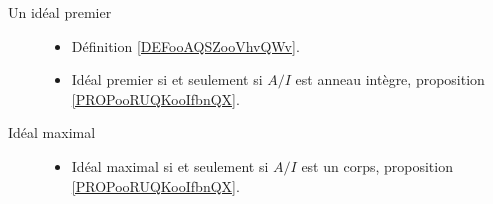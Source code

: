 \begin{description}
	\item[Un idéal premier]
		\begin{itemize}
			\item Définition \ref{DEFooAQSZooVhvQWv}.
			\item Idéal premier si et seulement si \( A/I\) est anneau intègre, proposition \ref{PROPooRUQKooIfbnQX}.
		\end{itemize}
	\item[Idéal maximal]
		\begin{itemize}
			\item
			      Idéal maximal si et seulement si \( A/I\) est un corps, proposition \ref{PROPooRUQKooIfbnQX}.
		\end{itemize}
\end{description}
